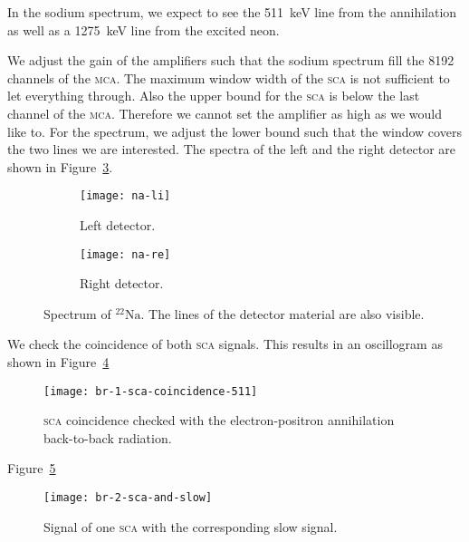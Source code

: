 \documentclass[11pt, english, fleqn, DIV=15, headinclude, BCOR=2cm]{scrreprt}
\begin{document}
In the sodium spectrum, we expect to see the \SI{511}{\kilo\electronvolt} line
from the annihilation as well as a \SI{1275}{\kilo\electronvolt} line from the
excited neon.

We adjust the gain of the amplifiers such that the sodium spectrum fill the
8192 channels of the \textsc{mca}. The maximum window width of the \textsc{sca}
is not sufficient to let everything through. Also the upper bound for the
\textsc{sca} is below the last channel of the \textsc{mca}. Therefore we cannot
set the amplifier as high as we would like to. For the spectrum, we adjust the
lower bound such that the window covers the two lines we are interested. The
spectra of the left and the right detector are shown in
Figure~\ref{fig:natrium}.

\begin{figure}
        \centering
        \begin{subfigure}[c]{.49\linewidth}
                \centering
                \texttt{[image: na-li]}
                \caption{%
                        Left detector.
                }
                \label{fig:na-li}
        \end{subfigure}
        \hfill
        \begin{subfigure}[c]{.49\linewidth}
                \centering
                \texttt{[image: na-re]}
                \caption{%
                        Right detector.
                }
                \label{fig:na-re}
        \end{subfigure}
        \caption{%
                Spectrum of ${}^{22}\text{Na}$. The lines of the detector
                material are also visible.
        }
        \label{fig:natrium}
\end{figure}

We check the coincidence of both \textsc{sca} signals. This results in an
oscillogram as shown in Figure~\ref{fig:1-sca-coincidence-511}

\begin{figure}
    \centering
    \texttt{[image: br-1-sca-coincidence-511]}
    \caption{%
        \textsc{sca} coincidence checked with the electron-positron
        annihilation back-to-back radiation.
    }
    \label{fig:1-sca-coincidence-511}
\end{figure}

Figure~\ref{fig:2-sca-and-slow}

\begin{figure}
    \centering
    \texttt{[image: br-2-sca-and-slow]}
    \caption{%
        Signal of one \textsc{sca} with the corresponding slow signal.
    }
    \label{fig:2-sca-and-slow}
\end{figure}
\end{document}
